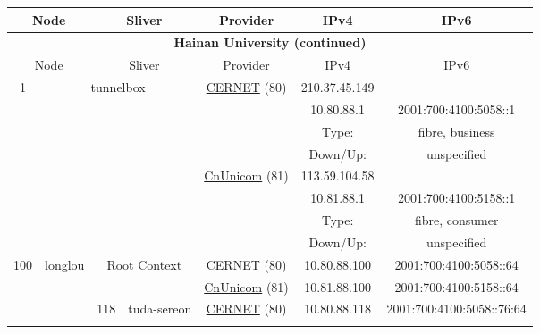 \begin{small}
\begin{center}
\begin{longtable}{|c|c|c|c|c|c|c|c|}
 \multicolumn{2}{|p{8em}|}{Node} & \multicolumn{2}{|p{8em}|}{Sliver} & \multicolumn{2}{|p{8em}|}{Provider} & IPv4 & IPv6 \\ \hline
\endfirsthead
\hline
 \multicolumn{8}{|c|}{\textbf{Hainan University (continued)}} \\ \hline
 \multicolumn{2}{|p{8em}|}{Node} & \multicolumn{2}{|p{8em}|}{Sliver} & \multicolumn{2}{|p{8em}|}{Provider} & IPv4 & IPv6 \\ \hline
\endhead
 \multirow{8}{*}{\tiny{1}} & \multicolumn{3}{|c|}{\multirow{8}{*}{\tiny{tunnelbox}}} & \multicolumn{2}{|c|}{\multirow{4}{*}{\tiny{\href{http://www.cernet.edu.cn}{CERNET} (80)}}} & \tiny{210.37.45.149} & \frownie{} \\* \cline{7-7}\cline{8-8}
  & \multicolumn{3}{|c|}{} & \multicolumn{2}{|c|}{} & \tiny{10.80.88.1} & \tiny{2001:700:4100:5058::1} \\* \cline{7-7}\cline{8-8}
  & \multicolumn{3}{|c|}{} & \multicolumn{2}{|c|}{} & Type: & fibre, business \\* \cline{7-7}\cline{8-8}
  & \multicolumn{3}{|c|}{} & \multicolumn{2}{|c|}{} & Down/Up:  & unspecified \\* \cline{5-5}\cline{6-6}\cline{7-7}\cline{8-8}
  & \multicolumn{3}{|c|}{} & \multicolumn{2}{|c|}{\multirow{4}{*}{\tiny{\href{http://www.chinaunicom.com}{CnUnicom} (81)}}} & \tiny{113.59.104.58} & \frownie{} \\* \cline{7-7}\cline{8-8}
  & \multicolumn{3}{|c|}{} & \multicolumn{2}{|c|}{} & \tiny{10.81.88.1} & \tiny{2001:700:4100:5158::1} \\* \cline{7-7}\cline{8-8}
  & \multicolumn{3}{|c|}{} & \multicolumn{2}{|c|}{} & Type: & fibre, consumer \\* \cline{7-7}\cline{8-8}
  & \multicolumn{3}{|c|}{} & \multicolumn{2}{|c|}{} & Down/Up:  & unspecified \\ \hline
 \multirow{32}{*}{\tiny{100}} & \multicolumn{1}{|l|}{\multirow{32}{*}{\tiny{longlou}}} & \multicolumn{2}{|c|}{\multirow{2}{*}{\tiny{Root Context}}} & \multicolumn{2}{|c|}{\tiny{\href{http://www.cernet.edu.cn}{CERNET} (80)}} & \tiny{10.80.88.100} & \tiny{2001:700:4100:5058::64} \\* \cline{5-5}\cline{6-6}\cline{7-7}\cline{8-8}
  &  & \multicolumn{2}{|c|}{} & \multicolumn{2}{|c|}{\tiny{\href{http://www.chinaunicom.com}{CnUnicom} (81)}} & \tiny{10.81.88.100} & \tiny{2001:700:4100:5158::64} \\* \cline{3-3}\cline{4-4}\cline{5-5}\cline{6-6}\cline{7-7}\cline{8-8}
  &  & \multirow{2}{*}{\tiny{118}} & \multicolumn{1}{|l|}{\multirow{2}{*}{\tiny{tuda-sereon}}} & \multicolumn{2}{|c|}{\tiny{\href{http://www.cernet.edu.cn}{CERNET} (80)}} & \tiny{10.80.88.118} & \tiny{2001:700:4100:5058::76:64} \\* \cline{5-5}\cline{6-6}\cline{7-7}\cline{8-8}

\end{longtable}
\end{center}
\end{small}
